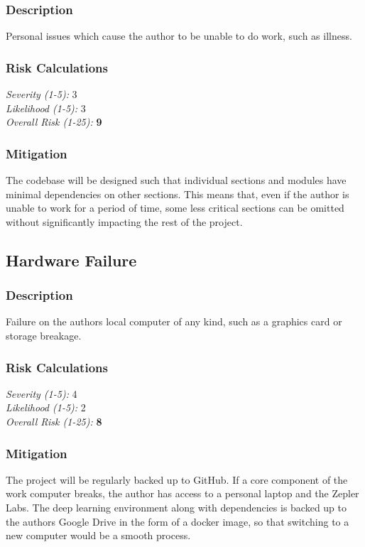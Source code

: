 \subsubsection{Description}
Personal issues which cause the author to be unable to do work, such as illness.

\subsubsection{Risk Calculations}
\emph{Severity (1-5):} 3 \\
\emph{Likelihood (1-5):} 3 \\
\emph{Overall Risk (1-25):} \textbf{9}

\subsubsection{Mitigation}
The codebase will be designed such that individual sections and modules have minimal dependencies on other sections. This means that, even if the author is unable to work for a period of time, some less critical sections can be omitted without significantly impacting the rest of the project.

\subsection{Hardware Failure}
\subsubsection{Description}
Failure on the authors local computer of any kind, such as a graphics card or storage breakage.

\subsubsection{Risk Calculations}
\emph{Severity (1-5):} 4 \\
\emph{Likelihood (1-5):} 2 \\
\emph{Overall Risk (1-25):} \textbf{8}

\subsubsection{Mitigation}
The project will be regularly backed up to GitHub. If a core component of the work computer breaks, the author has access to a personal laptop and the Zepler Labs. The deep learning environment along with dependencies is backed up to the authors Google Drive in the form of a docker image, so that switching to a new computer would be a smooth process.

